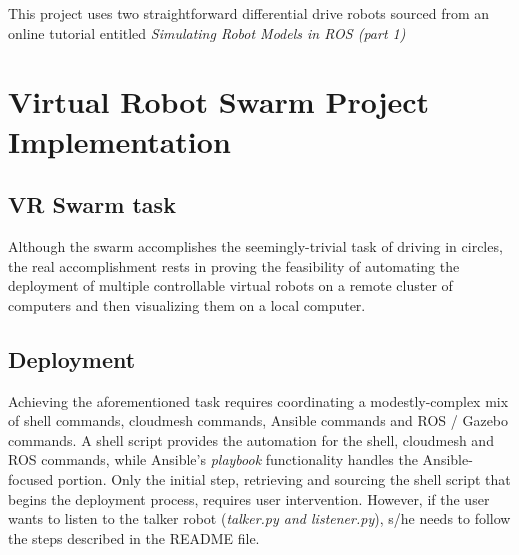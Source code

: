 \documentclass[9pt,twocolumn,twoside]{../../styles/osajnl}
\begin{document}
This project uses two straightforward differential drive robots sourced from an online tutorial entitled \textit{Simulating Robot Models in ROS (part 1)} \cite{www-mybot-moore}

\section{Virtual Robot Swarm Project Implementation}
\subsection{VR Swarm task}

Although the swarm accomplishes the seemingly-trivial task of driving in circles, the real accomplishment rests in proving the feasibility of automating the deployment of multiple controllable virtual robots on a remote cluster of computers and then visualizing them on a local computer.

\subsection{Deployment}
Achieving the aforementioned task requires coordinating a modestly-complex mix of shell commands, cloudmesh commands, Ansible commands and ROS / Gazebo commands. A shell script provides the automation for the shell, cloudmesh and ROS commands, while Ansible's \textit{playbook} functionality handles the Ansible-focused portion.  Only the initial step, retrieving and sourcing the shell script that begins the deployment process, requires user intervention.  However, if the user wants to listen to the talker robot (\textit{talker.py and listener.py}), s/he needs to follow the steps described in the README file.
\end{document}
